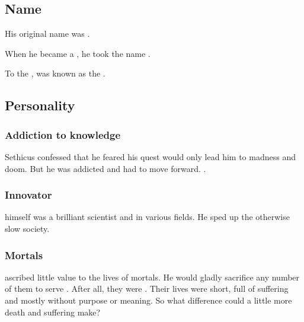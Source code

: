 \subsection{Name}
His original name was . 

When he became a \dragon, he took the name \emph{\Sethicus}. 

To the \Ortaicans, \Sethicus was known as the \taortha {}.









\subsection{Personality}





\subsubsection{Addiction to knowledge}
Sethicus confessed that he feared his quest would only lead him to madness and doom. 
But he was addicted and had to move forward. 
. 





\subsubsection{Innovator}
\Sethicus himself was a brilliant scientist and  in various fields. 
He sped up the otherwise slow \ophidian society. 





\subsubsection{Mortals}
\Sethicus ascribed little value to the lives of mortals. 
He would gladly sacrifice any number of them to serve . 
After all, they were . 
Their lives were short, full of suffering and mostly without purpose or meaning.
So what difference could a little more death and suffering make?






